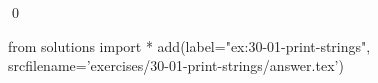 
\begin{ex}
  \label{ex:30-01-print-strings}
  
  \qed
\end{ex}
\begin{python0}
from solutions import *
add(label="ex:30-01-print-strings",
    srcfilename='exercises/30-01-print-strings/answer.tex')
\end{python0}
